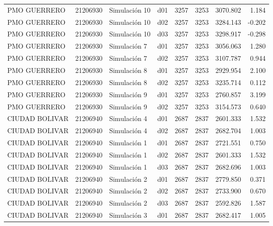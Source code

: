 \begin{landscape}
\begin{longtable}{lrlp{2cm}p{2cm}p{3cm}p{2cm}r}
            PMO GUERRERO &  21206930 &  Simulación 10 &   d01 &      3257 &     3253 &  3070.802 &     1.184 \\
            PMO GUERRERO &  21206930 &  Simulación 10 &   d02 &      3257 &     3253 &  3284.143 &    -0.202 \\
            PMO GUERRERO &  21206930 &  Simulación 10 &   d03 &      3257 &     3253 &  3298.917 &    -0.298 \\
            PMO GUERRERO &  21206930 &   Simulación 7 &   d01 &      3257 &     3253 &  3056.063 &     1.280 \\
            PMO GUERRERO &  21206930 &   Simulación 7 &   d02 &      3257 &     3253 &  3107.787 &     0.944 \\
            PMO GUERRERO &  21206930 &   Simulación 8 &   d01 &      3257 &     3253 &  2929.954 &     2.100 \\
            PMO GUERRERO &  21206930 &   Simulación 8 &   d02 &      3257 &     3253 &  3235.714 &     0.112 \\
            PMO GUERRERO &  21206930 &   Simulación 9 &   d01 &      3257 &     3253 &  2760.857 &     3.199 \\
            PMO GUERRERO &  21206930 &   Simulación 9 &   d02 &      3257 &     3253 &  3154.573 &     0.640 \\
          CIUDAD BOLIVAR &  21206940 &   Simulación 4 &   d01 &      2687 &     2837 &  2601.333 &     1.532 \\
          CIUDAD BOLIVAR &  21206940 &   Simulación 4 &   d02 &      2687 &     2837 &  2682.704 &     1.003 \\
          CIUDAD BOLIVAR &  21206940 &   Simulación 1 &   d01 &      2687 &     2837 &  2721.551 &     0.750 \\
          CIUDAD BOLIVAR &  21206940 &   Simulación 1 &   d02 &      2687 &     2837 &  2601.333 &     1.532 \\
          CIUDAD BOLIVAR &  21206940 &   Simulación 1 &   d03 &      2687 &     2837 &  2682.696 &     1.003 \\
          CIUDAD BOLIVAR &  21206940 &   Simulación 2 &   d01 &      2687 &     2837 &  2779.850 &     0.371 \\
          CIUDAD BOLIVAR &  21206940 &   Simulación 2 &   d02 &      2687 &     2837 &  2733.900 &     0.670 \\
          CIUDAD BOLIVAR &  21206940 &   Simulación 2 &   d03 &      2687 &     2837 &  2592.826 &     1.587 \\
          CIUDAD BOLIVAR &  21206940 &   Simulación 3 &   d01 &      2687 &     2837 &  2682.417 &     1.005 \\

\end{longtable}
\end{landscape}
